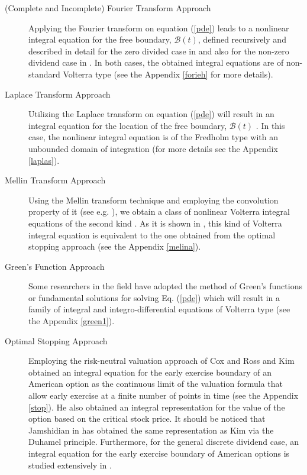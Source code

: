 \documentclass[fleqn,final,3p,11pt]{elsarticle}
\theoremstyle{definition}
\theoremstyle{remark}
\numberwithin{equation}{section}
\begin{document}
\begin{description}
\item [(Complete and Incomplete) Fourier Transform Approach] \label{A}
Applying the Fourier transform on equation (\ref{pde}) leads to a nonlinear integral equation  for the free boundary, $\mathcal{B}(t)$, defined recursively and described in detail for the zero divided case in \cite{stamicar} and also for  the non-zero dividend case in  \cite{shev2}. In both cases, the obtained integral equations are of non-standard Volterra type (see the Appendix \ref{forieh} for more details).

\item [Laplace Transform Approach]
Utilizing the Laplace transform on equation (\ref{pde}) will result in an integral equation for the location of the free boundary, $ \mathcal{B}(t) $ \cite{gada1}. In this case, the  nonlinear  integral equation is of the Fredholm type with an unbounded domain of integration (for more details see the Appendix \ref{laplas}).

 \item [Mellin Transform Approach]
Using the Mellin  transform technique and employing the convolution property of it (see e.g. \cite{patrik2}), we obtain a class  of nonlinear Volterra integral equations of the second kind \cite{brunner}. As it is shown in \cite{panini}, this kind of Volterra integral equation is equivalent to the one obtained from the optimal stopping approach (see the Appendix \ref{melina}).

\item [Green's Function Approach]
    Some researchers in the field have adopted the method of Green's functions or fundamental solutions \cite{stack} for solving Eq. (\ref{pde})
      which will result in a family of integral and integro-differential equations of Volterra type \cite{chen, evans, keller} (see the Appendix \ref{green1}).
 \item[Optimal Stopping Approach]  Employing the risk-neutral valuation approach of Cox and Ross \cite{cox} and Kim \cite{kim} obtained an integral equation for the early exercise boundary of an American option
as the continuous limit of the valuation formula that allow early exercise at a finite number of points in time
   (see the Appendix \ref{stop}). He also obtained an integral representation for the value of the option based on the critical stock price. It should be noticed that Jamshidian in \cite{jam} has obtained the same representation as Kim \cite{chia, jam} via the Duhamel principle. Furthermore, for the general discrete dividend case, an integral equation for the early exercise boundary of American options is studied extensively in \cite{vellek1, vellek2}.
\end{description}
\end{document}
